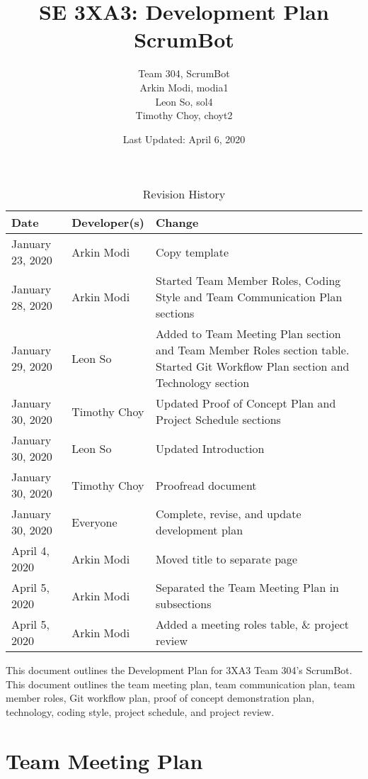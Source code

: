 \documentclass[12pt, titlepage]{article}
\title{SE 3XA3: Development Plan\\ScrumBot}
\author{
    Team 304, ScrumBot
        \\ Arkin Modi, modia1
        \\ Leon So, sol4
        \\ Timothy Choy, choyt2
}
\date{Last Updated: April 6, 2020}
\begin{document}
\maketitle
{}
\newpage

\begin{table}[H]
    \caption{Revision History} \label{TblRevisionHistory}
    \begin{tabularx}{\textwidth}{llX}
        \toprule
            \textbf{Date} & \textbf{Developer(s)} & \textbf{Change}\\
        \midrule
            January 23, 2020 & Arkin Modi & Copy template\\
            January 28, 2020 & Arkin Modi & Started Team Member Roles, Coding Style and Team Communication Plan sections\\
            January 29, 2020 & Leon So & Added to Team Meeting Plan section and Team Member Roles section table. Started Git Workflow Plan section and Technology section\\
            January 30, 2020 & Timothy Choy & Updated Proof of Concept Plan and Project Schedule sections\\
            January 30, 2020 & Leon So & Updated Introduction\\
            January 30, 2020 & Timothy Choy & Proofread document\\
            January 30, 2020 & Everyone & Complete, revise, and update development plan\\
            April 4, 2020 & Arkin Modi & Moved title to separate page\\
            April 5, 2020 & Arkin Modi & Separated the Team Meeting Plan in subsections\\
            April 5, 2020 & Arkin Modi & Added a meeting roles table, \& project review\\
        \bottomrule
    \end{tabularx}
\end{table}

\newpage
{}

\noindent This document outlines the Development Plan for 3XA3 Team 304's ScrumBot. This document outlines the team meeting plan, team communication plan, team member roles, Git workflow plan, proof of concept demonstration plan, technology, coding style, project schedule, and project review.

\section{Team Meeting Plan}
\end{document}
